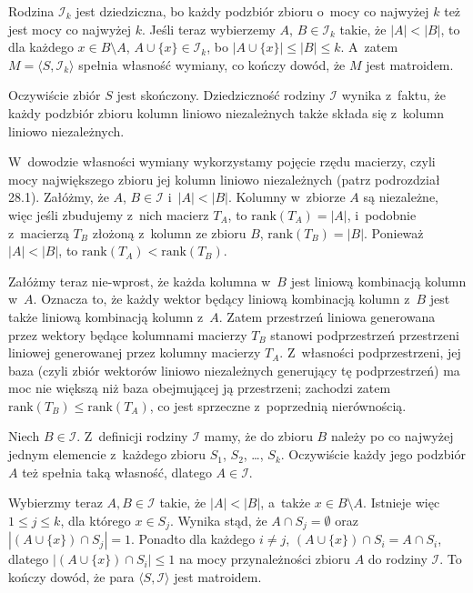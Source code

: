 
\exercise %
Rodzina $\mathcal{I}_k$ jest dziedziczna, bo każdy podzbiór zbioru o~mocy co najwyżej $k$ też jest mocy co najwyżej $k$.
Jeśli teraz wybierzemy $A$, $B\in\mathcal{I}_k$ takie, że $|A|<|B|$, to dla każdego $x\in B\setminus A$, $A\cup\{x\}\in\mathcal{I}_k$, bo $|A\cup\{x\}|\le|B|\le k$.
A~zatem $M=\langle S,\mathcal{I}_k\rangle$ spełnia własność wymiany, co kończy dowód, że $M$ jest matroidem.

\exercise %
Oczywiście zbiór $S$ jest skończony.
Dziedziczność rodziny $\mathcal{I}$ wynika z~faktu, że każdy podzbiór zbioru kolumn liniowo niezależnych także składa się z~kolumn liniowo niezależnych.

W~dowodzie własności wymiany wykorzystamy pojęcie rzędu macierzy, czyli mocy największego zbioru jej kolumn liniowo niezależnych (patrz podrozdział 28.1).
Załóżmy, że $A$, $B\in\mathcal{I}$ i~$|A|<|B|$.
Kolumny w~zbiorze $A$ są niezależne, więc jeśli zbudujemy z~nich macierz $T_A$, to $\mathrm{rank}(T_A)=|A|$, i~podobnie z~macierzą $T_B$ złożoną z~kolumn ze zbioru $B$, $\mathrm{rank}(T_B)=|B|$.
Ponieważ $|A|<|B|$, to $\mathrm{rank}(T_A)<\mathrm{rank}(T_B)$.

Załóżmy teraz nie-wprost, że każda kolumna w~$B$ jest liniową kombinacją kolumn w~$A$.
Oznacza to, że każdy wektor będący liniową kombinacją kolumn z~$B$ jest także liniową kombinacją kolumn z~$A$.
Zatem przestrzeń liniowa generowana przez wektory będące kolumnami macierzy $T_B$ stanowi podprzestrzeń przestrzeni liniowej generowanej przez kolumny macierzy $T_A$.
Z~własności podprzestrzeni, jej baza (czyli zbiór wektorów liniowo niezależnych generujący tę podprzestrzeń) ma moc nie większą niż baza obejmującej ją przestrzeni; zachodzi zatem $\mathrm{rank}(T_B)\le\mathrm{rank}(T_A)$, co jest sprzeczne z~poprzednią nierównością.

\exercise %
\exercise %
Niech $B\in\mathcal{I}$.
Z~definicji rodziny $\mathcal{I}$ mamy, że do zbioru $B$ należy po co najwyżej jednym elemencie z~każdego zbioru $S_1$, $S_2$, \dots, $S_k$.
Oczywiście każdy jego podzbiór $A$ też spełnia taką własność, dlatego $A\in\mathcal{I}$.

Wybierzmy teraz $A,B\in\mathcal{I}$ takie, że $|A|<|B|$, a~także $x\in B\setminus A$.
Istnieje więc $1\le j\le k$, dla którego $x\in S_j$.
Wynika stąd, że $A\cap S_j=\emptyset$ oraz $|(A\cup\{x\})\cap S_j|=1$.
Ponadto dla każdego $i\ne j$, $(A\cup\{x\})\cap S_i=A\cap S_i$, dlatego $|(A\cup\{x\})\cap S_i|\le1$ na mocy przynależności zbioru $A$ do rodziny $\mathcal{I}$.
To kończy dowód, że para $\langle S,\mathcal{I}\rangle$ jest matroidem.

